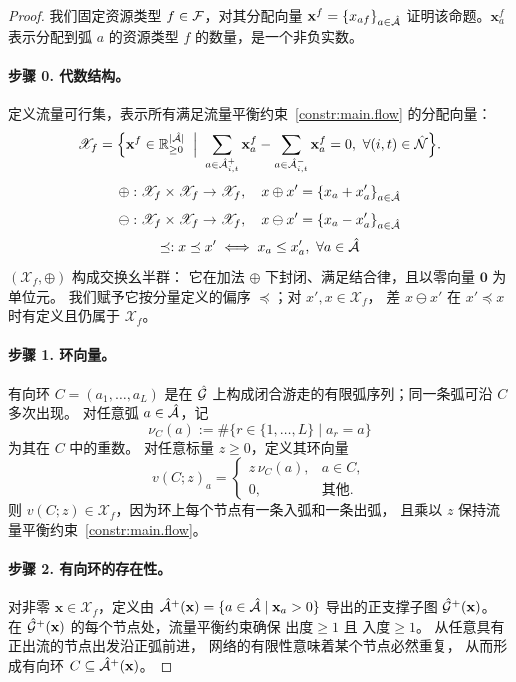 \begin{proof}
    \newcommand{\assignmentVector}{\mathbf{x}}
    \newcommand{\feasibleSet}{\mathscr{X}}
    \newcommand{\vectorAdd}{\oplus }
    \newcommand{\vectorMinus}{\ominus}
    \newcommand{\vectorLe}{\preceq}
我们固定资源类型 $f\in\mathcal{F}$，对其分配向量 $\assignmentVector^f=\{\fleetAssignVar_{af}\}_{a\in\arcSet}$ 证明该命题。$\assignmentVector^f_{a}$ 表示分配到弧 $a$ 的资源类型 $f$ 的数量，是一个非负实数。

\paragraph{步骤 0. 代数结构。}
定义流量可行集，表示所有满足流量平衡约束~\eqref{constr:main.flow} 的分配向量：
\[
\feasibleSet_f=\Bigl\{
\assignmentVector^f\in\mathbb{R}_{\ge0}^{\lvert\arcSet\rvert}\;\Bigm|\;
\sum_{a\in\outArcSet{i,t}}\assignmentVector^f_{a}-\sum_{a\in\inArcSet{i,t}}\assignmentVector^f_{a}=0,\ \forall(i,t)\in\nodeSet
\Bigr\}.
\]
\[
    \vectorAdd: \feasibleSet_f \times \feasibleSet_f \to \feasibleSet_f,\quad x \vectorAdd x' = \{x_a + x'_a\}_{a\in\arcSet}
\]
\[
    \vectorMinus: \feasibleSet_f \times \feasibleSet_f \to \feasibleSet_f,\quad x \vectorMinus x' = \{x_a - x'_a\}_{a\in\arcSet}
\]
\[
    \vectorLe: x \vectorLe x' \iff x_a \le x'_a,\ \forall a\in\arcSet
\]
$(\feasibleSet_f,\vectorAdd)$ 构成交换幺半群：
它在加法 $\vectorAdd$ 下封闭、满足结合律，且以零向量 $\mathbf{0}$ 为单位元。
我们赋予它按分量定义的偏序 $\vectorLe$；对 $x',x\in\feasibleSet_f$，
差 $x\vectorMinus x'$ 在 $x'\vectorLe x$ 时有定义且仍属于 $\feasibleSet_f$。

\paragraph{步骤 1. 环向量。}
有向环 $C=(a_1,\ldots,a_L)$ 是在 $\hat{\mathcal{G}}$ 上构成闭合游走的有限弧序列；同一条弧可沿 $C$ 多次出现。
对任意弧 $a\in\hat{\mathcal{A}}$，记
\[
    \nu_{C}(a) := \#\{r\in\{1,\ldots,L\}\mid a_r = a\}
\]
为其在 $C$ 中的重数。
对任意标量 $z\ge 0$，定义其环向量
\[
v(C;z)_a=
\begin{cases}
z\,\nu_{C}(a),& a\in C,\\[2pt]
0,&\text{其他}.
\end{cases}
\]
则 $v(C;z)\in\feasibleSet_f$，因为环上每个节点有一条入弧和一条出弧，
且乘以 $z$ 保持流量平衡约束~\eqref{constr:main.flow}。

\paragraph{步骤 2. 有向环的存在性。}
对非零 $\assignmentVector\in\feasibleSet_f$，定义由 $\arcSet^+(\assignmentVector)=\{a\in\arcSet\mid \assignmentVector_a>0\}$ 导出的正支撑子图 ${\net}^+(\assignmentVector)$。
在 ${\net}^+(\assignmentVector)$ 的每个节点处，流量平衡约束确保
$\text{出度}\ge1$ 且 $\text{入度}\ge1$。
从任意具有正出流的节点出发沿正弧前进，
网络的有限性意味着某个节点必然重复，
从而形成有向环 $C\subseteq \arcSet^+(\assignmentVector)$。


\end{proof}
